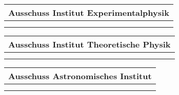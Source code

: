 \documentclass[a4paper, 14pt]{article}
\begin{document}
\begin{table}[h!]
	\begin{tabular}{|p{5cm}|p{5cm}|p{5cm}|p{5cm}|} \hline
		\multicolumn{4}{|c}{\textbf{Ausschuss Institut Experimentalphysik}} \\ \hline
		& \censor{} &  & \censor{}\\ 
		& \censor{} &  & \censor{}\\  \hline
	\end{tabular}
	\vspace{0,5cm}
	
	\begin{tabular}{|p{5cm}|p{5cm}|p{5cm}|p{5cm}|} \hline
		\multicolumn{4}{|c|}{\textbf{Ausschuss Institut Theoretische Physik}} \\ \hline
		& \censor{} &  & \censor{}\\ 
		& \censor{} &  & \censor{}\\  \hline
	\end{tabular}
	\vspace{0,5cm}
	
	\begin{tabular}{|p{5cm}|p{5cm}|p{5cm}|p{5cm}|} \hline
		\multicolumn{4}{|c|}{\textbf{Ausschuss Astronomisches Institut}} \\ \hline
		& \censor{} &  & \censor{}\\ 
		& \censor{} &  & \censor{}\\  \hline
	\end{tabular}
	\vspace{0,5cm}
\end{table}
\end{document}
